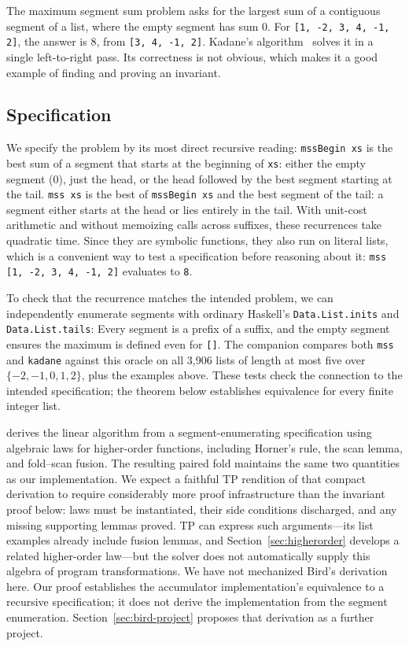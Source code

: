 \documentclass[review]{jfp-epi}
\newcommand{\code}[1]{\texttt{#1}}
\begin{document}
The maximum segment sum problem asks for the largest sum of a contiguous segment
of a list, where the empty segment has sum 0. For
\code{[1, -2, 3, 4, -1, 2]}, the answer is 8, from \code{[3, 4, -1, 2]}.
Kadane's algorithm~\citep[Algorithm~4]{bentley} solves it in a single left-to-right pass.
Its correctness is not obvious, which makes it a good example of finding and
proving an invariant.

\subsection{Specification}

We specify the problem by its most direct recursive reading:
\code{mssBegin xs} is the best sum of a segment that starts at the beginning of
\code{xs}: either the empty segment (0), just the head, or the head followed by
the best segment starting at the tail. \code{mss xs} is the best of
\code{mssBegin xs} and the best segment of the tail: a segment either starts at
the head or lies entirely in the tail. With unit-cost arithmetic and without
memoizing calls across suffixes, these recurrences take quadratic time. Since they are
symbolic functions, they also run on literal lists, which is a convenient way to
test a specification before reasoning about it:
\code{mss [1, -2, 3, 4, -1, 2]} evaluates to \code{8}.

To check that the recurrence matches the intended problem, we can independently
enumerate segments with ordinary Haskell's \code{Data.List.inits} and
\code{Data.List.tails}:
Every segment is a prefix of a suffix, and the empty segment ensures the
maximum is defined even for \code{[]}. The companion compares both \code{mss}
and \code{kadane} against this oracle on all 3,906 lists of length at most five
over $\{-2,-1,0,1,2\}$, plus the examples above. These tests check the connection
to the intended specification; the theorem below establishes equivalence for
every finite integer list.

\citet{birdCalculation} derives the linear algorithm from a segment-enumerating
specification using algebraic laws for higher-order functions, including
Horner's rule, the scan lemma, and fold--scan fusion. The resulting paired fold
maintains the same two quantities as our implementation. We expect a faithful
TP rendition of that compact derivation to require considerably more proof
infrastructure than the invariant proof below: laws must be instantiated,
their side conditions discharged, and any missing supporting lemmas proved.
TP can express such arguments---its list examples already include fusion
lemmas, and Section~\ref{sec:higherorder} develops a related higher-order law---but
the solver does not automatically supply this algebra of program transformations.
We have not mechanized Bird's derivation here. Our proof establishes the
accumulator implementation's equivalence to a recursive specification; it does
not derive the implementation from the segment enumeration.
Section~\ref{sec:bird-project} proposes that derivation as a further project.
\end{document}
